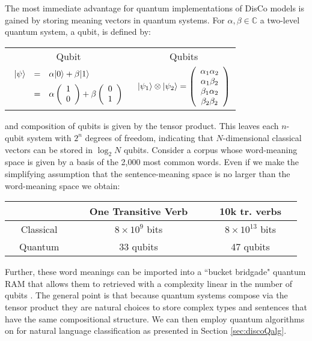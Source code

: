 The most immediate advantage for quantum implementations of DisCo models is gained by storing meaning vectors in quantum systems.  For $\alpha,\beta\in \mathbb{C}$ a two-level quantum system, a qubit, is defined by:
\begin{center}
  \begin{tabular}{cc}
   Qubit & Qubits  \\
   $\begin{array}{lcl}
        | \psi \rangle &=& \alpha| 0 \rangle+\beta| 1 \rangle \\[0.2cm]
        &=&\alpha\left(\begin{array}{c} 1 \\ 0 \end{array}\right)
            +\beta\left(\begin{array}{c} 0 \\ 1 \end{array}\right)
   \end{array}$ 
   &\qquad\qquad
   $| \psi_1 \rangle\otimes| \psi_2 \rangle = \left(\begin{array}{c} \alpha_1\alpha_2 \\ \alpha_1\beta_2\\\beta_1\alpha_2\\\beta_2\beta_2 \end{array}\right)$
   \\
  \end{tabular}
\end{center}
and composition of qubits is given by the tensor product.  This leaves each $n$-qubit system with $2^n$ degrees of freedom, indicating that $N$-dimensional classical vectors can be stored in $\log_2 N$ qubits.
Consider a corpus whose word-meaning space is given by a basis of the 2,000 most common words. Even if we make the simplifying assumption that the sentence-meaning space is no larger than the word-meaning space we obtain:
\begin{center}
\begin{tabular}{|c|c|c|}\hline
 & ~~One Transitive Verb~~ & ~~10k tr. verbs~~ \\\hline
 ~Classical~ & $8\times 10^{9}$ bits & $8\times 10^{13}$ bits \\\hline
 ~~Quantum~~ & 33 qubits & 47 qubits \\\hline
\end{tabular}
\end{center}
Further, these word meanings can be imported into a ``bucket bridgade" quantum RAM that allows them to retrieved with a complexity linear in the number of qubits \cite{giovannetti2008quantum}. The general point is that because quantum systems compose via the tensor product they are natural choices to store complex types and sentences that have the same compositional structure. We can then employ quantum algorithms on for natural language classification as presented in Section \ref{sec:discoQalg}.

